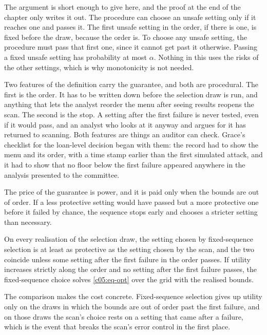 The argument is short enough to give here, and the proof at the end of the chapter only
writes it out. The procedure can choose an unsafe setting only if it reaches one and
passes it. The first unsafe setting in the order, if there is one, is fixed before the
draw, because the order is. To choose any unsafe setting, the procedure must pass that
first one, since it cannot get past it otherwise. Passing a fixed unsafe setting has
probability at most $\alpha$. Nothing in this uses the risks of the other settings, which
is why monotonicity is not needed.

Two features of the definition carry the guarantee, and both are procedural. The first is
the order. It has to be written down before the selection draw is run, and anything that
lets the analyst reorder the menu after seeing results reopens the scan. The second is
the stop. A setting after the first failure is never tested, even if it would pass, and
an analyst who looks at it anyway and argues for it has returned to scanning. Both
features are things an auditor can check. Grace's checklist for the loan-level decision
began with them: the record had to show the menu and its order, with a time stamp
earlier than the first simulated attack, and it had to show that no floor below the
first failure appeared anywhere in the analysis presented to the committee.

The price of the guarantee is power, and it is paid only when the bounds are out of
order. If a less protective setting would have passed but a more protective one before it
failed by chance, the sequence stops early and chooses a stricter setting than necessary.

\begin{proposition}\label{c05:prop-compare}
On every realisation of the selection draw, the setting chosen by fixed-sequence
selection is at least as protective as the setting chosen by the scan, and the two
coincide unless some setting after the first failure in the order passes. If utility
increases strictly along the order and no setting after the first failure passes, the
fixed-sequence choice solves \eqref{c05:eq-opt} over the grid with the realised bounds.
\end{proposition}

The comparison makes the cost concrete. Fixed-sequence selection gives up utility only on
the draws in which the bounds are out of order past the first failure, and on those draws
the scan's choice rests on a setting that came after a failure, which is the event that
breaks the scan's error control in the first place.

